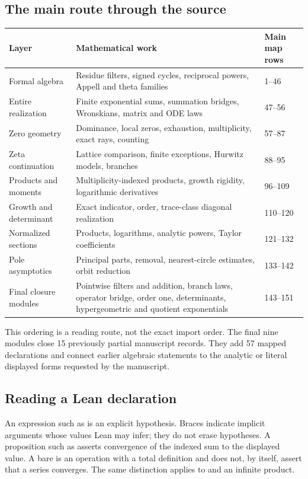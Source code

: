 \subsection{The main route through the source}
\begin{longtable}{p{}p{}p{}}
\toprule Layer & Mathematical work & Main map rows \\ \midrule\endhead
Formal algebra & Residue filters, signed cycles, reciprocal powers, Appell and theta families & 1--46 \\
Entire realization & Finite exponential sums, summation bridges, Wronskians, matrix and ODE laws & 47--56 \\
Zero geometry & Dominance, local zeros, exhaustion, multiplicity, exact rays, counting & 57--87 \\
Zeta continuation & Lattice comparison, finite exceptions, Hurwitz models, branches & 88--95 \\
Products and moments & Multiplicity-indexed products, growth rigidity, logarithmic derivatives & 96--109 \\
Growth and determinant & Exact indicator, order, trace-class diagonal realization & 110--120 \\
Normalized sections & Products, logarithms, analytic powers, Taylor coefficients & 121--132 \\
Pole asymptotics & Principal parts, removal, nearest-circle estimates, orbit reduction & 133--142 \\
Final closure modules & Pointwise filters and addition, branch laws, operator bridge, order one, determinants, hypergeometric and quotient exponentials & 143--151 \\
\bottomrule
\end{longtable}
This ordering is a reading route, not the exact import order. The final nine modules close 15 previously partial manuscript records. They add 57 mapped declarations and connect earlier algebraic statements to the analytic or literal displayed forms requested by the manuscript.

\subsection{Reading a Lean declaration}
An expression such as  is an explicit hypothesis. Braces indicate implicit arguments whose values Lean may infer; they do not erase hypotheses. A proposition such as  asserts convergence of the indexed sum to the displayed value. A bare  is an operation with a total definition and does not, by itself, assert that a series converges. The same distinction applies to  and an infinite product.

